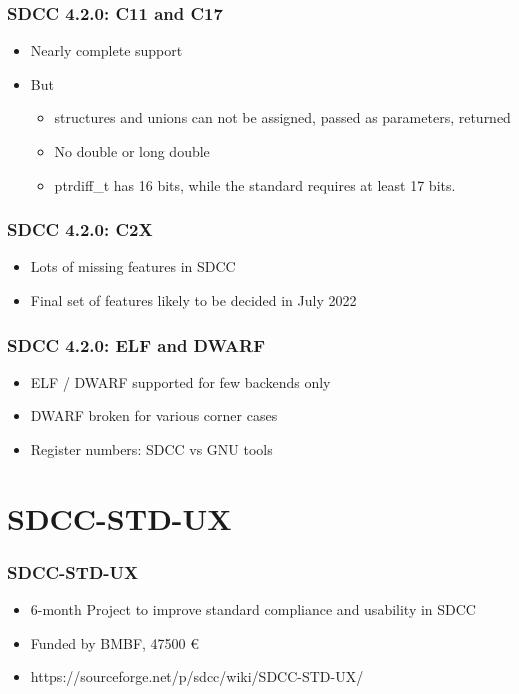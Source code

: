 \documentclass[xcolor=dvipsnames]{beamer}
\begin{document}
\begin{frame}
	\frametitle{SDCC 4.2.0: C11 and C17}
	\begin{itemize}
		\item Nearly complete support
		\item But
		\begin{itemize}
			\item structures and unions can not be assigned, passed as parameters, returned
			\item No double or long double
			\item ptrdiff\_t has 16 bits, while the standard requires at least 17 bits.
		\end{itemize}
	\end{itemize}
\end{frame}

\begin{frame}
	\frametitle{SDCC 4.2.0: C2X}
	\begin{itemize}
		\item Lots of missing features in SDCC
		\item Final set of features likely to be decided in July 2022
	\end{itemize}
\end{frame}

\begin{frame}
	\frametitle{SDCC 4.2.0: ELF and DWARF}
	\begin{itemize}
		\item ELF / DWARF supported for few backends only
		\item DWARF broken for various corner cases
		\item Register numbers: SDCC vs GNU tools
	\end{itemize}
\end{frame}

\section{SDCC-STD-UX}

\begin{frame}
	\frametitle{SDCC-STD-UX}
	\begin{itemize}
		\item 6-month Project to improve standard compliance and usability in SDCC
		\item Funded by BMBF, 47500 €
		\item https://sourceforge.net/p/sdcc/wiki/SDCC-STD-UX/
	\end{itemize}
\end{frame}
\end{document}
